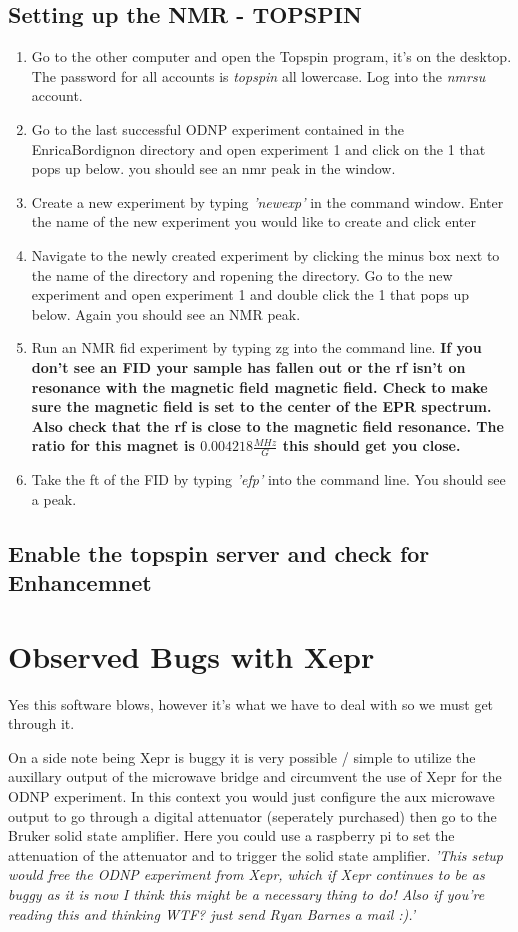 \documentclass{article}
\newcommand{\fc}[1]{{\color{blue}\textit{'{#1}'}}}
\begin{document}
\subsection{Setting up the NMR - TOPSPIN}
\begin{enumerate}
    \item Go to the other computer and open the Topspin program, it's on the desktop. The password for all accounts is \textit{topspin} all lowercase. Log into the \textit{nmrsu} account.
    \item Go to the last successful ODNP experiment contained in the EnricaBordignon directory and open experiment 1 and click on the 1 that pops up below. you should see an nmr peak in the window.
    \item Create a new experiment by typing \fc{newexp} in the command window. Enter the name of the new experiment you would like to create and click enter
    \item Navigate to the newly created experiment by clicking the minus box next to the name of the directory and ropening the directory. Go to the new experiment and open experiment 1 and double click the 1 that pops up below. Again you should see an NMR peak.
    \item Run an NMR fid experiment by typing zg into the command line. \bf{If you don't see an FID your sample has fallen out or the rf isn't on resonance with the magnetic field magnetic field. Check to make sure the magnetic field is set to the center of the EPR spectrum. Also check that the rf is close to the magnetic field resonance. The ratio for this magnet is $0.004218 \frac{MHz}{G}$ this should get you close.}
    \item Take the ft of the FID by typing \fc{efp} into the command line. You should see a peak.
\end{enumerate}
\subsection{Enable the topspin server and check for Enhancemnet}


\section{Observed Bugs with Xepr}
Yes this software blows, however it's what we have to deal with so we must get through it.

On a side note being Xepr is buggy it is very possible / simple to utilize the auxillary output of the microwave bridge and circumvent the use of Xepr for the ODNP experiment. In this context you would just configure the aux microwave output to go through a digital attenuator (seperately purchased) then go to the Bruker solid state amplifier. Here you could use a raspberry pi to set the attenuation of the attenuator and to trigger the solid state amplifier. \fc{This setup would free the ODNP experiment from Xepr, which if Xepr continues to be as buggy as it is now I think this might be a necessary thing to do! Also if you're reading this and thinking WTF? just send Ryan Barnes a mail :).}
\end{document}
